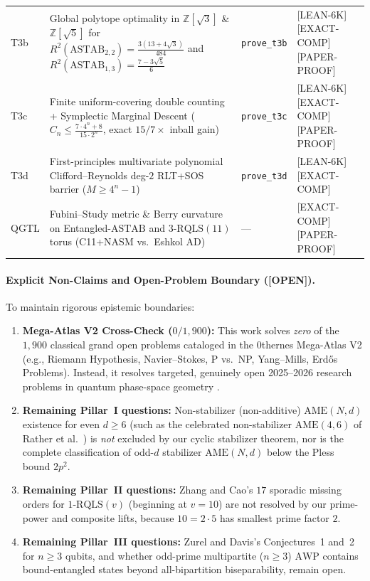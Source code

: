 \documentclass[11pt,reqno]{amsart}
\theoremstyle{definition}
\newcommand{\ZZ}{\mathbb{Z}}
\newcommand{\AME}{\mathrm{AME}}
\newcommand{\RQLS}{\mathrm{RQLS}}
\newcommand{\ASTAB}{\mathrm{ASTAB}}
\newcommand{\AWP}{\mathrm{AWP}}
\newcommand{\lid}[1]{{\footnotesize\nolinkurl{#1}}}
\newcommand{\tagL}{\textsf{\footnotesize[LEAN-6K]}}
\newcommand{\tagE}{\textsf{\footnotesize[EXACT-COMP]}}
\newcommand{\tagP}{\textsf{\footnotesize[PAPER-PROOF]}}
\newcommand{\tagO}{\textsf{\footnotesize[OPEN]}}
\begin{document}
\begin{table}[htbp]
\begin{tabularx}{\textwidth}{@{}l >{\raggedright\arraybackslash}X l l@{}}
T3b & Global polytope optimality in $\ZZ[\sqrt{3}]$ \& $\ZZ[\sqrt{5}]$ for $R^2(\ASTAB_{2,2}) = \frac{3(13+4\sqrt{3})}{484}$ and $R^2(\ASTAB_{1,3}) = \frac{7-3\sqrt{5}}{6}$ & \lid{prove_t3b} & \tagL\,\tagE\,\tagP \\
T3c & Finite uniform-covering double counting + Symplectic Marginal Descent ($C_n \le \frac{7\cdot 4^n + 8}{15\cdot 2^n}$, exact $15/7\times$ inball gain) & \lid{prove_t3c} & \tagL\,\tagE\,\tagP \\
T3d & First-principles multivariate polynomial Clifford--Reynolds deg-$2$ RLT+SOS barrier ($M \ge 4^n - 1$) & \lid{prove_t3d} & \tagL\,\tagE \\
\addlinespace
QGTL & Fubini--Study metric \& Berry curvature on Entangled-$\ASTAB$ and $3$-$\RQLS(11)$ torus (C11+NASM vs.\ Eshkol AD) & --- & \tagE\,\tagP \\
\bottomrule
\end{tabularx}
\end{table}

\paragraph{Explicit Non-Claims and Open-Problem Boundary (\tagO).}
To maintain rigorous epistemic boundaries:
\begin{enumerate}[label=(\arabic*)]
  \item \textbf{Mega-Atlas V2 Cross-Check ($0/1{,}900$):} This work solves \emph{zero}
    of the $1{,}900$ classical grand open problems cataloged in the 0thernes Mega-Atlas
    V2 (e.g., Riemann Hypothesis, Navier--Stokes, P vs.\ NP, Yang--Mills, Erd\H{o}s
    Problems). Instead, it resolves targeted, genuinely open 2025--2026 research problems
    in quantum phase-space geometry \cite{wojcik2026ame,zhang2026rqls,zurel2026astab,
    liu2025triangle}.
  \item \textbf{Remaining Pillar~I questions:} Non-stabilizer (non-additive) $\AME(N,d)$
    existence for even $d \ge 6$ (such as the celebrated non-stabilizer $\AME(4,6)$ of
    Rather et al.\ \cite{rather2022euler}) is \emph{not} excluded by our cyclic
    stabilizer theorem, nor is the complete classification of odd-$d$ stabilizer
    $\AME(N,d)$ below the Pless bound $2p^2$.
  \item \textbf{Remaining Pillar~II questions:} Zhang and Cao's $17$ sporadic missing
    orders for $1$-$\RQLS(v)$ (beginning at $v=10$) are not resolved by our prime-power
    and composite lifts, because $10 = 2 \cdot 5$ has smallest prime factor $2$.
  \item \textbf{Remaining Pillar~III questions:} Zurel and Davis's Conjectures~1 and~2
    for $n \ge 3$ qubits, and whether odd-prime multipartite ($n \ge 3$) $\AWP$ contains
    bound-entangled states beyond all-bipartition biseparability, remain open.
\end{enumerate}
\end{document}
